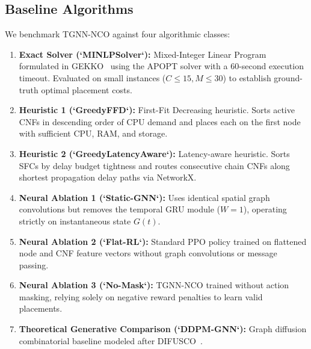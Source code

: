 \documentclass[conference]{IEEEtran}
\begin{document}
\subsection{Baseline Algorithms}
We benchmark TGNN-NCO against four algorithmic classes:
\begin{enumerate}
    \item \textbf{Exact Solver (`MINLPSolver`):} Mixed-Integer Linear Program formulated in GEKKO~\cite{beal2018gekko} using the APOPT solver with a 60-second execution timeout. Evaluated on small instances ($C \le 15, M \le 30$) to establish ground-truth optimal placement costs.
    \item \textbf{Heuristic 1 (`GreedyFFD`):} First-Fit Decreasing heuristic. Sorts active CNFs in descending order of CPU demand and places each on the first node with sufficient CPU, RAM, and storage.
    \item \textbf{Heuristic 2 (`GreedyLatencyAware`):} Latency-aware heuristic. Sorts SFCs by delay budget tightness and routes consecutive chain CNFs along shortest propagation delay paths via NetworkX.
    \item \textbf{Neural Ablation 1 (`Static-GNN`):} Uses identical spatial graph convolutions but removes the temporal GRU module ($W=1$), operating strictly on instantaneous state $G(t)$.
    \item \textbf{Neural Ablation 2 (`Flat-RL`):} Standard PPO policy trained on flattened node and CNF feature vectors without graph convolutions or message passing.
    \item \textbf{Neural Ablation 3 (`No-Mask`):} TGNN-NCO trained without action masking, relying solely on negative reward penalties to learn valid placements.
    \item \textbf{Theoretical Generative Comparison (`DDPM-GNN`):} Graph diffusion combinatorial baseline modeled after DIFUSCO~\cite{sun2023difusco}.
\end{enumerate}
\end{document}
